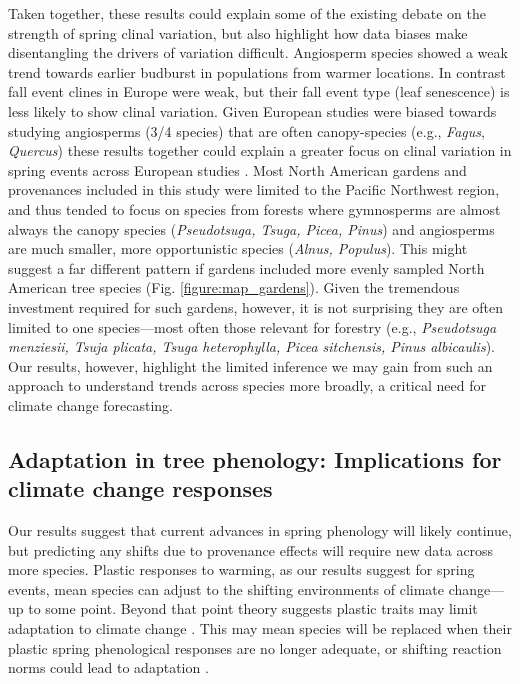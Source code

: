 \documentclass{article}
\begin{document}
Taken together, these results could explain some of the existing debate on the strength of spring clinal variation, but also highlight how data biases make disentangling the drivers of variation difficult. Angiosperm species showed a weak trend towards earlier budburst in populations from warmer locations. In contrast fall event clines in Europe were weak, but their fall event type (leaf senescence) is less likely to show clinal variation. Given European studies were biased towards studying angiosperms (3/4 species) that are often canopy-species (e.g., \emph{Fagus}, \emph{Quercus}) these results together could explain a greater focus on clinal variation in spring events across European studies \citep{Basler:2012,gauzere2020,sog08,deans96,von95}. Most North American gardens and provenances included in this study were limited to the Pacific Northwest region, and thus tended to focus on species from forests where gymnosperms are almost always the canopy species (\emph{Pseudotsuga, Tsuga, Picea, Pinus}) and angiosperms are much smaller, more opportunistic species (\emph{Alnus, Populus}). This might suggest a far different pattern if gardens included more evenly sampled North American tree species (Fig. \ref{figure:map_gardens}). Given the tremendous investment required for such gardens, however, it is not surprising they are often limited to one species---most often those relevant for forestry (e.g., \emph{Pseudotsuga menziesii, Tsuja plicata, Tsuga heterophylla, Picea sitchensis, Pinus albicaulis}). Our results, however, highlight the limited inference we may gain from such an approach to understand trends across species more broadly, a critical need for climate change forecasting.

\subsection{Adaptation in tree phenology: Implications for climate change responses}

Our results suggest that current advances in spring phenology will likely continue, but predicting any shifts due to provenance effects will require new data across more species. Plastic responses to warming, as our results suggest for spring events, mean species can adjust to the shifting environments of climate change---up to some point. Beyond that point theory suggests plastic traits may limit adaptation to climate change \citep{chevin10}. This may mean species will be replaced when their plastic spring phenological responses are no longer adequate, or shifting reaction norms could lead to adaptation \citep{gauzere2020}. 
\end{document}
